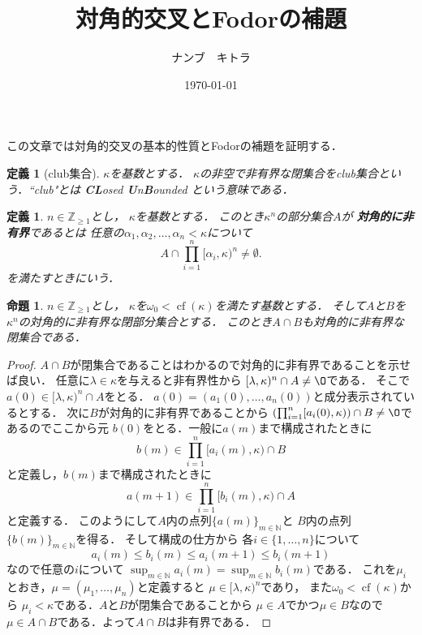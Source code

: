 \documentclass[leqno]{jsarticle}
\title{対角的交叉とFodorの補題}
\author{ナンブ　キトラ}
\date{\today}
\newtheorem{prop}[thm]{命題}
\newtheorem{df}[thm]{定義}
\newcommand{\nn}{\mathbb{N}}
\newcommand{\zz}{\mathbb{Z}}
\newcommand{\dpst}{\displaystyle}
\newcommand{\al}{\alpha}
\newcommand{\la}{\lambda}
\DeclareMathOperator{\cf}{cf}
\begin{document}
\maketitle

この文章では対角的交叉の基本的性質とFodorの補題を証明する．


\begin{df}[club集合]\normalfont
$\kappa$を基数とする．
$\kappa$の非空で非有界な閉集合をclub集合という．``club"とは \textbf{CL}osed \textbf{U}n\textbf{B}ounded という意味である．
\end{df}

\begin{df}
$n\in \zz_{\ge 1}$とし，
$\kappa$を基数とする．
このとき$\kappa^n$の部分集合$A$が
\textbf{対角的に非有界}であるとは
任意の$\alpha_1, \al_2, \dots, \al_n< \kappa$について
\[
A\cap \prod_{i=1}^n[\alpha_i, \kappa )^n\neq \emptyset. 
\]
を満たすときにいう．
\end{df}



\begin{prop}\label{prop:dia}
$n\in \zz_{\ge 1}$とし，
$\kappa$を$\omega_0<\cf(\kappa)$を満たす基数とする．
そして$A$と$B$を$\kappa^n$の対角的に非有界な閉部分集合とする．
このとき$A\cap B$も対角的に非有界な閉集合である．
\end{prop}
\begin{proof}
$A\cap B$が閉集合であることはわかるので対角的に非有界であることを示せば良い．
任意に$\la\in \kappa$を与えると非有界性から
$[\la,\kappa)^n\cap A\neq \O$である．
そこで$a(0)\in [\la,\kappa)^n\cap A$をとる．
$a(0)=(a_1(0), \dots, a_n(0))$と成分表示されているとする．
次に$B$が対角的に非有界であることから
$\left(\prod_{i=1}^n[a_i(0),\kappa)\right)\cap B\neq\O$であるのでここから元
$b(0)$をとる．一般に$a(m)$まで構成されたときに
\[
b(m)\in \prod_{i=1}^n[a_i(m),\kappa)\cap B
\]
と定義し，$b(m)$まで構成されたときに
\[
a({m+1})\in \prod_{i=1}^n[b_i(m),\kappa)\cap A
\]
と定義する．
このようにして$A$内の点列$\{a(m)\}_{m\in \nn}$と
$B$内の点列$\{b(m)\}_{m\in\nn}$を得る．
そして構成の仕方から
各$i\in \{1, \dots, n\}$について
\[
a_i(m)\le b_i(m)\le a_i(m+1)\le b_i(m+1)
\]
なので任意の$i$について
$\dpst \sup_{m\in\nn}a_i(m)=\sup_{m\in \nn}b_i(m)$である．
これを$\mu_i$とおき，$\mu=(\mu_1, \dots, \mu_n)$と定義すると
$\mu\in [\la, \kappa)^n$であり，
また$\omega_0<\cf(\kappa)$から
$\mu_i< \kappa$である．$A$と$B$が閉集合であることから
$\mu\in A$でかつ$\mu\in B$なので$\mu\in A\cap B$である．よって$A\cap B$は非有界である．
\end{proof}
\end{document}
